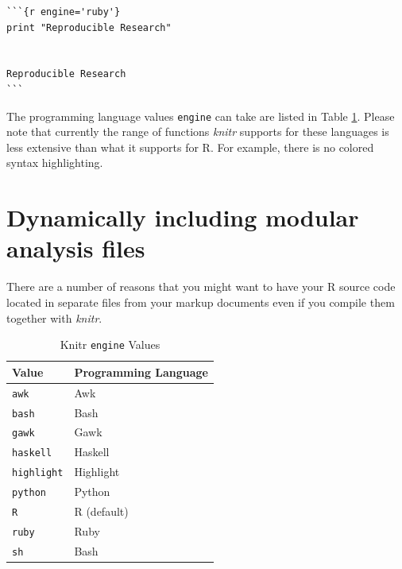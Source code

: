 {\begin{knitrout}
\color{fgcolor}\begin{kframe}
\begin{verbatim}
```{r engine='ruby'}
print "Reproducible Research"
 

Reproducible Research
```
\end{verbatim}
\end{kframe}
\end{knitrout}

The programming language values \texttt{engine} can take are listed in Table \ref{EngineOptions}. Please note that currently the range of functions {\emph{knitr}} supports for these languages is less extensive than what it supports for R. For example, there is no colored syntax highlighting.

\section{Dynamically including modular analysis files}

There are a number of reasons that you might want to have your R source code located in separate files from your markup documents even if you compile them together with {\emph{knitr}}.

\begin{table}
    \caption{Knitr \texttt{engine} Values}
    \label{EngineOptions}
    \begin{tabular}{l p{2.25cm}}
    \hline\vspace{0.15cm}
    Value & Programming Language \\
    \hline\hline
    \texttt{awk} & Awk\index{Awk} \\
    \texttt{bash} & Bash\index{Bash} \\
    \texttt{gawk} & Gawk\index{Gawk} \\
    \texttt{haskell} & Haskell\index{Haskell} \\
    \texttt{highlight} & Highlight\index{Highlight, knitr engine option} \\ 
    \texttt{python} & Python\index{Python} \\
    \texttt{R} & R (default) \\[0.25cm]
    \texttt{ruby} & Ruby\index{Ruby} \\
    \texttt{sh} & Bash \\
    \hline
    \end{tabular}
\end{table}

}
